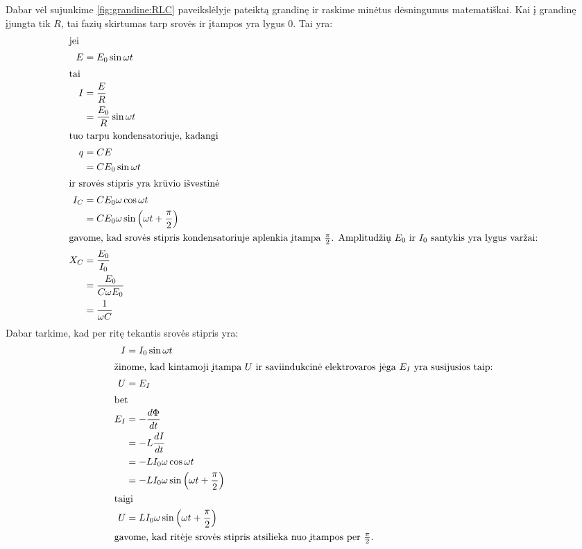 Dabar vėl sujunkime \ref{fig:grandine:RLC} paveikslėlyje pateiktą grandinę
ir raskime minėtus dėsningumus matematiškai. Kai į grandinę įjungta tik
$R$, tai fazių skirtumas tarp srovės ir įtampos yra lygus 0. Tai yra:
\begin{align*}
  \intertext{jei}
  E
    &= E_{0} \sin \omega t \\
  \intertext{tai}
  I
    &= \frac{E}{R} \\
    &= \frac{E_{0}}{R} \sin \omega t \\
  \intertext{tuo tarpu kondensatoriuje, kadangi}
  q
    &= CE \\
    &= C E_{0} \sin \omega t \\
  \intertext{ir srovės stipris yra krūvio išvestinė}
  I_{C}
    &= C E_{0} \omega \cos \omega t \\
    &= C E_{0} \omega \sin \left( \omega t + \frac{\pi}{2} \right) \\
  \intertext{gavome, kad srovės stipris kondensatoriuje aplenkia įtampa
  $\frac{\pi}{2}$. Amplitudžių $E_{0}$ ir $I_{0}$ santykis yra lygus
  varžai:}
  X_{C}
    &= \frac{E_{0}}{I_{0}} \\
    &= \frac{E_{0}}{C \omega E_{0}} \\
    &= \frac{1}{\omega C} \\
\end{align*}
Dabar tarkime, kad per ritę tekantis srovės stipris yra:
\begin{align*}
  I
    &= I_{0} \sin \omega t \\
  \intertext{žinome, kad kintamoji įtampa $U$ ir saviindukcinė
  elektrovaros jėga $E_{I}$ yra susijusios taip:}
  U
    &= E_{I} \\
  \intertext{bet}
  E_{I}
    &= - \frac{d \Phi}{d t} \\
    &= - L \frac{d I}{d t} \\
    &= - L I_{0} \omega \cos \omega t \\
    &= - L I_{0} \omega \sin \left( \omega t + \frac{\pi}{2} \right) \\
  \intertext{taigi}
  U
    &= L I_{0} \omega \sin \left( \omega t + \frac{\pi}{2} \right) \\
  \intertext{gavome, kad ritėje srovės stipris atsilieka nuo įtampos
  per $\frac{\pi}{2}$.}
\end{align*}

